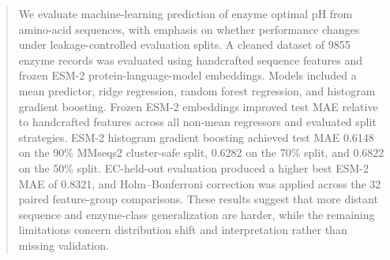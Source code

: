 \begin{abstract}
We evaluate machine-learning prediction of enzyme optimal pH from amino-acid sequences, with emphasis on whether performance changes under leakage-controlled evaluation splits. A cleaned dataset of 9855 enzyme records was evaluated using handcrafted sequence features and frozen ESM-2 protein-language-model embeddings. Models included a mean predictor, ridge regression, random forest regression, and histogram gradient boosting. Frozen ESM-2 embeddings improved test MAE relative to handcrafted features across all non-mean regressors and evaluated split strategies. ESM-2 histogram gradient boosting achieved test MAE 0.6148 on the 90\% MMseqs2 cluster-safe split, 0.6282 on the 70\% split, and 0.6822 on the 50\% split. EC-held-out evaluation produced a higher best ESM-2 MAE of 0.8321, and Holm--Bonferroni correction was applied across the 32 paired feature-group comparisons. These results suggest that more distant sequence and enzyme-class generalization are harder, while the remaining limitations concern distribution shift and interpretation rather than missing validation.
\end{abstract}
